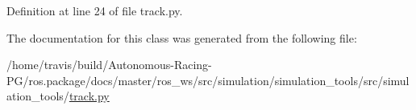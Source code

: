 Definition at line 24 of file track.\+py.



The documentation for this class was generated from the following file\+:\begin{DoxyCompactItemize}
\item 
/home/travis/build/\+Autonomous-\/\+Racing-\/\+P\+G/ros.\+package/docs/master/ros\+\_\+ws/src/simulation/simulation\+\_\+tools/src/simulation\+\_\+tools/\hyperlink{track_8py}{track.\+py}\end{DoxyCompactItemize}
